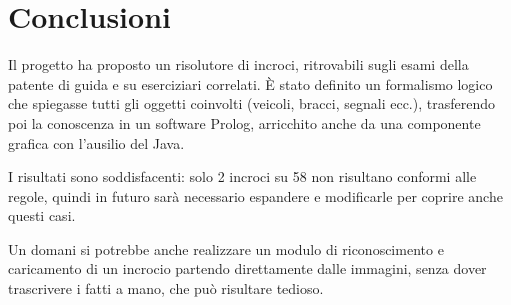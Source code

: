 \chapter{Conclusioni}

Il progetto ha proposto un risolutore di incroci, ritrovabili sugli esami della patente di guida e su eserciziari correlati. È stato definito un formalismo logico che spiegasse tutti gli oggetti coinvolti (veicoli, bracci, segnali ecc.), trasferendo poi la conoscenza in un software Prolog, arricchito anche da una componente grafica con l'ausilio del Java.

I risultati sono soddisfacenti: solo 2 incroci su 58 non risultano conformi alle regole, quindi in futuro sarà necessario espandere e modificarle per coprire anche questi casi.

Un domani si potrebbe anche realizzare un modulo di riconoscimento e caricamento di un incrocio partendo direttamente dalle immagini, senza dover trascrivere i fatti a mano, che può risultare tedioso.